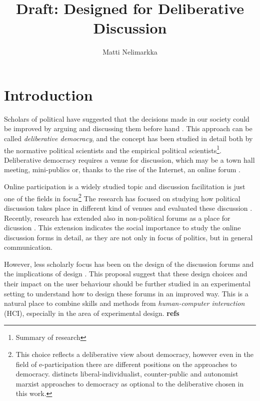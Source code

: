 \documentclass[journal,a4paper]{IEEEtran}
\author{Matti Nelimarkka}
\title{Draft: Designed for Deliberative Discussion}
\begin{document}
\maketitle

\setlength{\parindent}{0pt}
\setlength{\parskip}{1ex}

\section{Introduction}

Scholars of political have suggested that the decisions made in our society could be improved by arguing and discussing them before hand \cite{xxx}. This approach can be called \textit{deliberative democracy}, and the concept has been studied in detail both by the normative political scientists and the empirical political scientists\footnote{Summary of research}. Deliberative democracy requires a venue for discussion, which may be a town hall meeting, mini-publics or, thanks to the rise of the Internet, an online forum .

Online participation is a widely studied topic and discussion facilitation is just one of the fields in focus\footnote{This choice reflects a deliberative view about democracy, however even in the field of e-participation there are different positions on the approaches to democracy.  distincts liberal-individualist, counter-public and autonomist marxist approaches to democracy as optional to the deliberative chosen in this work.} The research has focused on studying how political discussion takes place in different kind of venues  and evaluated these discussion . Recently, research has extended also in non-political forums as a place for dicussion \cite{graham12}. This extension indicates the social importance to study the online discussion forms in detail, as they are not only in focus of politics, but in general communication.

However, less scholarly focus has been on the design of the discussion forums and the implications of design . This proposal suggest that these design choices and their impact on the user behaviour should be further studied in an experimental setting to understand how to design these forums in an improved way. This is a natural place to combine skills and methods from \textit{human-computer interaction} (HCI), especially in the area of experimental design. \textbf{refs}
\end{document}
